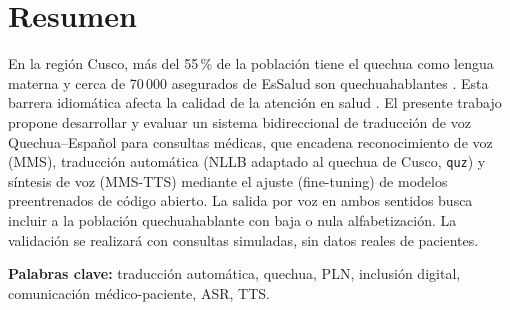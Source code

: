 \documentclass[12pt,a4paper]{article}
\newif\ifmostrarindices
\begin{document}
\section*{Resumen}
En la regi{\'o}n Cusco, m{\'a}s del 55\,\% de la poblaci{\'o}n tiene el quechua como lengua
materna y cerca de 70\,000 asegurados de EsSalud son quechuahablantes \parencite{essalud2023}.
Esta barrera idiom{\'a}tica afecta la calidad de la atenci{\'o}n en salud \parencite{begazo2026}.
El presente trabajo propone desarrollar y evaluar un sistema bidireccional de traducci{\'o}n
de voz Quechua--Espa{\~n}ol para consultas m{\'e}dicas, que encadena reconocimiento de voz
(MMS), traducci{\'o}n autom{\'a}tica (NLLB adaptado al quechua de Cusco, \texttt{quz}) y
s{\'i}ntesis de voz (MMS-TTS) mediante el ajuste (fine-tuning) de modelos preentrenados de
c{\'o}digo abierto. La salida por voz en ambos sentidos busca incluir a la poblaci{\'o}n
quechuahablante con baja o nula alfabetizaci{\'o}n. La validaci{\'o}n se realizar{\'a} con
consultas simuladas, sin datos reales de pacientes.

\vspace{0.3cm}
\noindent\textbf{Palabras clave:} traducci{\'o}n autom{\'a}tica, quechua, PLN, inclusi{\'o}n digital, comunicaci{\'o}n m{\'e}dico-paciente, ASR, TTS.

\ifmostrarindices

\newpage
\tableofcontents                                   %

\clearpage
{}
\listoffigures                                     %

\clearpage
{}
\listoftables                                      %

\clearpage
{}
\listofalgorithms                                  %

\clearpage                                          %
\end{document}
